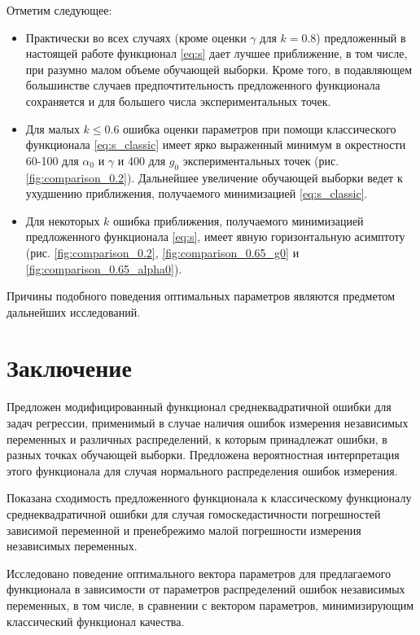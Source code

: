 \documentclass[tikz,10pt,a4paper]{article}
\begin{document}
Отметим следующее:
\begin{itemize}
  \item Практически во всех случаях (кроме оценки $\gamma$ для $k = 0.8$)
	предложенный в настоящей работе функционал \eqref{eq:s}
	дает лучшее приближение, в том числе, при разумно малом объеме обучающей выборки. Кроме того, в
	подавляющем большинстве случаев предпочтительность предложенного функционала
	сохраняется и для большего числа экспериментальных точек.
  \item Для малых $k \leq 0.6$ ошибка оценки параметров при помощи классического
	функционала \eqref{eq:s_classic} имеет ярко выраженный минимум в окрестности 60-100
	для $\alpha_0$ и $\gamma$ и 400 для $g_0$ экспериментальных точек
	(рис. \ref{fig:comparison_0.2}).
	Дальнейшее увеличение обучающей выборки ведет к ухудшению приближения, получаемого
	минимизацией \eqref{eq:s_classic}.
  \item Для некоторых $k$ ошибка приближения, получаемого минимизацией предложенного
	функционала \eqref{eq:s}, имеет явную горизонтальную асимптоту (рис. \ref{fig:comparison_0.2},
	\ref{fig:comparison_0.65_g0} и \ref{fig:comparison_0.65_alpha0}).
\end{itemize}

Причины подобного поведения оптимальных параметров являются предметом
дальнейших исследований.

\section{Заключение}

Предложен модифицированный функционал среднеквадратичной ошибки для задач
регрессии, применимый в случае наличия ошибок измерения независимых
переменных и различных распределений, к которым принадлежат ошибки, в разных
точках обучающей выборки. Предложена вероятностная интерпретация этого
функционала для случая нормального распределения ошибок измерения.

Показана сходимость предложенного функционала к классическому функционалу
среднеквадратичной ошибки для случая гомоскедастичности погрешностей
зависимой переменной и пренебрежимо малой погрешности измерения независимых
переменных.

Исследовано поведение оптимального вектора параметров для предлагаемого
функционала в зависимости от параметров распределений ошибок независимых
переменных, в том числе, в сравнении с вектором параметров, минимизирующим
классический функционал качества.
\end{document}
